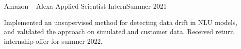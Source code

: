   {Amazon -- Alexa Applied Scientist Intern}{Summer 2021}

\vspace{0.15em}

Implemented an unsupervised method for detecting data drift in NLU models, and
validated the approach on simulated and customer data. Received return internship offer for summer 2022.
